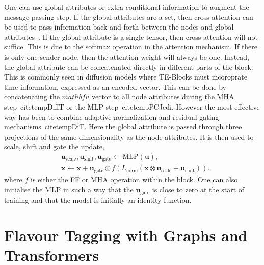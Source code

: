 One can use global attributes or extra conditional information to augment the message passing step.
If the global attributes are a set, then cross attention can be used to pass information back and forth between the nodes and global attributes~.
If the global attribute is a single tensor, then cross attention will not suffice.
This is due to the softmax operation in the attention mechanism.
If there is only one sender node, then the attention weight will always be one.
Instead, the global attribute can be concatenated directly in different parts of the block.
This is commonly seen in diffusion models where TE-Blocks must incoroprate time information, expressed as an encoded vector.
This can be done by concatenating the $mathbf{u}$ vector to all node attributes during the MHA step~citetemp{DiffT} or the MLP step~citetemp{PCJedi}.
However the most effective way has been to combine adaptive normalization and residual gating mechanisms~citetemp{DiT}.
Here the global attribute is passed through three projections of the same dimensionality as the node attributes.
It is then used to scale, shift and gate the update,
\begin{equation}
    \begin{aligned}
    & \mathbf{u}_\text{scale}, \mathbf{u}_\text{shift}, \mathbf{u}_\text{gate} \leftarrow \text{MLP}(\mathbf{u}), \\
    & \mathbf{x} \leftarrow \mathbf{x} + \mathbf{u}_\text{gate} \otimes f \left(L_\text{norm}(\mathbf{x} \otimes \mathbf{u}_\text{scale} + \mathbf{u}_\text{shift})\right).
    \end{aligned}
\end{equation}
where $f$ is either the FF or MHA operation within the block.
One can also initialise the MLP in such a way that the $\mathbf{u}_\text{gate}$ is close to zero at the start of training and that the model is initially an identity function.

\chapter{Flavour Tagging with Graphs and Transformers}

